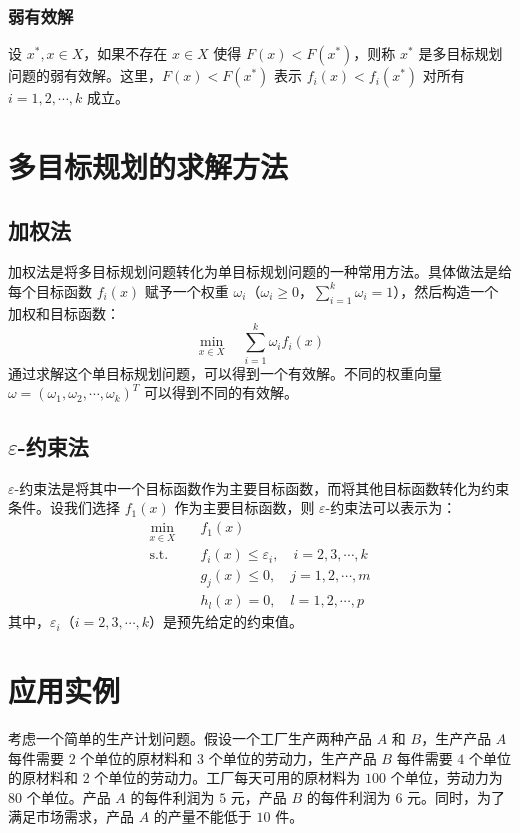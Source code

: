 \documentclass{article}
\begin{document}
\subsubsection{弱有效解}
设 $x^*, x \in X$，如果不存在 $x \in X$ 使得 $F(x) < F(x^*)$，则称 $x^*$ 是多目标规划问题的弱有效解。这里，$F(x) < F(x^*)$ 表示 $f_i(x) < f_i(x^*)$ 对所有 $i = 1, 2, \cdots, k$ 成立。

\section{多目标规划的求解方法}
\subsection{加权法}
加权法是将多目标规划问题转化为单目标规划问题的一种常用方法。具体做法是给每个目标函数 $f_i(x)$ 赋予一个权重 $\omega_i$（$\omega_i \geq 0$，$\sum_{i = 1}^{k} \omega_i = 1$），然后构造一个加权和目标函数：
\[
\min_{x \in X} \quad \sum_{i = 1}^{k} \omega_i f_i(x)
\]
通过求解这个单目标规划问题，可以得到一个有效解。不同的权重向量 $\omega = (\omega_1, \omega_2, \cdots, \omega_k)^T$ 可以得到不同的有效解。

\subsection{$\varepsilon$-约束法}
$\varepsilon$-约束法是将其中一个目标函数作为主要目标函数，而将其他目标函数转化为约束条件。设我们选择 $f_1(x)$ 作为主要目标函数，则 $\varepsilon$-约束法可以表示为：
\begin{align}
\min_{x \in X} \quad & f_1(x) \\
\text{s.t.} \quad & f_i(x) \leq \varepsilon_i, \quad i = 2, 3, \cdots, k \\
& g_j(x) \leq 0, \quad j = 1, 2, \cdots, m \\
& h_l(x) = 0, \quad l = 1, 2, \cdots, p
\end{align}
其中，$\varepsilon_i$（$i = 2, 3, \cdots, k$）是预先给定的约束值。

\section{应用实例}
考虑一个简单的生产计划问题。假设一个工厂生产两种产品 $A$ 和 $B$，生产产品 $A$ 每件需要 $2$ 个单位的原材料和 $3$ 个单位的劳动力，生产产品 $B$ 每件需要 $4$ 个单位的原材料和 $2$ 个单位的劳动力。工厂每天可用的原材料为 $100$ 个单位，劳动力为 $80$ 个单位。产品 $A$ 的每件利润为 $5$ 元，产品 $B$ 的每件利润为 $6$ 元。同时，为了满足市场需求，产品 $A$ 的产量不能低于 $10$ 件。
\end{document}
